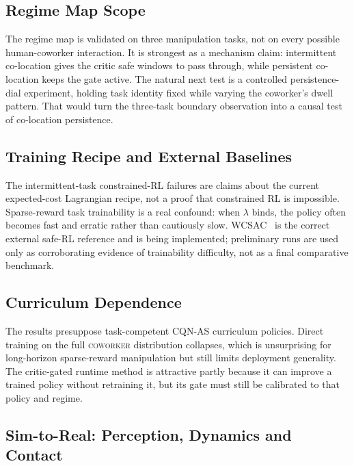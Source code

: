\documentclass[11pt,a4paper]{report}
\newcommand{\coworker}{\textsc{coworker}}
\begin{document}
\subsection{Regime Map Scope}
\label{sec:disc:arch-gen}

The regime map is validated on three manipulation tasks, not on every
possible human-coworker interaction. It is strongest as a mechanism
claim: intermittent co-location gives the critic safe windows to pass
through, while persistent co-location keeps the gate active. The
natural next test is a controlled persistence-dial experiment, holding
task identity fixed while varying the coworker's dwell pattern. That
would turn the three-task boundary observation into a causal test of
co-location persistence.

\subsection{Training Recipe and External Baselines}
\label{sec:disc:wcsac-honest}

The intermittent-task constrained-RL failures are claims about the
current expected-cost Lagrangian recipe, not a proof that constrained
RL is impossible. Sparse-reward task trainability is a real confound:
when $\lambda$ binds, the policy often becomes fast and erratic rather
than cautiously slow. WCSAC~\cite{yang2021wcsac} is the correct
external safe-RL reference and is being implemented; preliminary runs
are used only as corroborating evidence of trainability difficulty, not
as a final comparative benchmark.

\subsection{Curriculum Dependence}
\label{sec:disc:curriculum}

The results presuppose task-competent CQN-AS curriculum policies.
Direct training on the full \coworker{} distribution collapses, which
is unsurprising for long-horizon sparse-reward manipulation but still
limits deployment generality. The critic-gated runtime method is
attractive partly because it can improve a trained policy without
retraining it, but its gate must still be calibrated to that policy and
regime.

\subsection{Sim-to-Real: Perception, Dynamics and Contact}
\label{sec:disc:sim2real}
\end{document}
